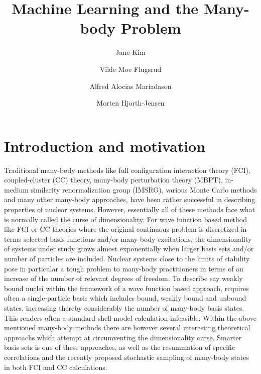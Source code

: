 \documentclass[aip,jcp,reprint,floatfix]{revtex4-1}
\begin{document}
\title{Machine Learning and the Many-body Problem}

\author{Jane Kim}

\author{Vilde Moe Flugsrud}

\author{Alfred Alocias Mariadason}


\author{Morten Hjorth-Jensen}



\begin{abstract}

\end{abstract}



\maketitle


\section{Introduction and motivation}

Traditional many-body methods like full configuration interaction
theory (FCI), coupled-cluster (CC) theory, many-body perturbation
theory (MBPT), in-medium similarity renormalization group (IMSRG),
various Monte Carlo methods and many other many-body approaches, have
been rather successful in describing properties of nuclear
systems. However, essentially all of these methods face what is
normally called the curse of dimensionality. For wave function based
method like FCI or CC theories where the original continuous problem
is discretized in terms selected basis functions and/or many-body
excitations, the dimensionality of systems under study grows almost
exponentially when larger basis sets and/or number of particles are
included. Nuclear systems close to the limits of stability pose in
particular a tough problem to many-body practitioners in terms of an
increase of the number of relevant degrees of freedom. To describe say
weakly bound nuclei within the framework of a wave function based
approach, requires often a single-particle basis which includes bound,
weakly bound and unbound states, increasing thereby considerably the
number of many-body basis states. This renders often a standard
shell-model calculation infeasible. Within the above mentioned
many-body methods there are however several interesting theoretical
approachs which attempt at circumventing the dimensionality
curse. Smarter basis sets is one of these approaches, as well as the
resummation of specific correlations and the recently proposed
stochastic sampling of many-body states in both FCI and CC
calculations.
\end{document}
